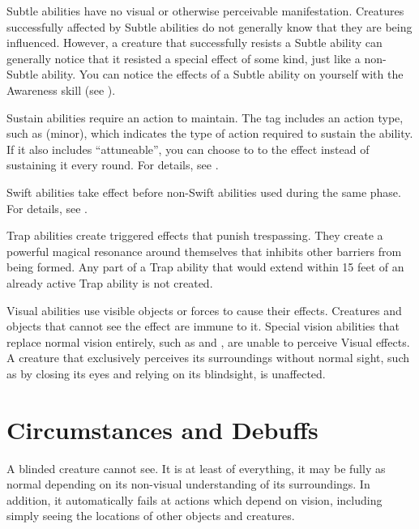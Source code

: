    Subtle abilities have no visual or otherwise perceivable manifestation.
  Creatures successfully affected by Subtle abilities do not generally know that they are being influenced.
  However, a creature that successfully resists a Subtle ability can generally notice that it resisted a special effect of some kind, just like a non-Subtle ability.
  You can notice the effects of a Subtle ability on yourself with the Awareness skill (see ).

   Sustain abilities require an action to maintain.
  The tag includes an action type, such as (minor), which indicates the type of action required to sustain the ability.
  If it also includes ``attuneable'', you can choose to  to the effect instead of sustaining it every round.
  For details, see .

   Swift abilities take effect before non-Swift abilities used during the same phase.
  For details, see .

   Trap abilities create triggered effects that punish trespassing.
  They create a powerful magical resonance around themselves that inhibits other barriers from being formed.
  Any part of a Trap ability that would extend within 15 feet of an already active Trap ability is not created.

   Visual abilities use visible objects or forces to cause their effects.
  Creatures and objects that cannot see the effect are immune to it.
  Special vision abilities that replace normal vision entirely, such as  and , are unable to perceive Visual effects.
  A creature that exclusively perceives its surroundings without normal sight, such as by closing its eyes and relying on its blindsight, is unaffected.

  \newpage
\section{Circumstances and Debuffs}\label{Circumstances and Debuffs}

   A blinded creature cannot see.
  It is at least \partiallyunaware of everything, it may be fully \unaware as normal depending on its non-visual understanding of its surroundings.
  In addition, it automatically fails at actions which depend on vision, including simply seeing the locations of other objects and creatures.

